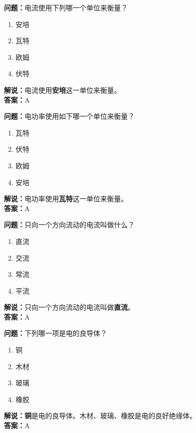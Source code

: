 \textbf{问题：}电流使用下列哪一个单位来衡量？

\begin{enumerate}[label=\Alph*), leftmargin=1cm]
	\item 安培
	\item 瓦特
	\item 欧姆
	\item 伏特
\end{enumerate}

\textbf{解说：}电流使用\textbf{安培}这一单位来衡量。\\\textbf{答案：}A%



\textbf{问题：}电功率使用如下哪一个单位来衡量？

\begin{enumerate}[label=\Alph*), leftmargin=1cm]
	\item 瓦特
	\item 伏特
	\item 欧姆
	\item 安培
\end{enumerate}

\textbf{解说：}电功率使用\textbf{瓦特}这一单位来衡量。\\\textbf{答案：}A



\textbf{问题：}只向一个方向流动的电流叫做什么？

\begin{enumerate}[label=\Alph*), leftmargin=1cm]
	\item 直流
	\item 交流
	\item 常流
	\item 平流
\end{enumerate}

\textbf{解说：}只向一个方向流动的电流叫做\textbf{直流}。\\\textbf{答案：}A



\textbf{问题：}下列哪一项是电的良导体？

\begin{enumerate}[label=\Alph*), leftmargin=1cm]
	\item 铜
	\item 木材
	\item 玻璃
	\item 橡胶
\end{enumerate}

\textbf{解说：}\textbf{铜}是电的良导体。木材、玻璃、橡胶是电的良好绝缘体。\\\textbf{答案：}A



